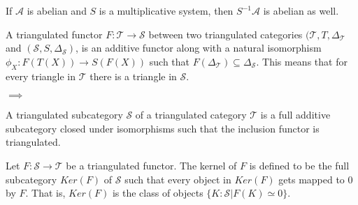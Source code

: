     \begin{corollary}
        If $\mathcal{A}$ is abelian and $S$ is a multiplicative system, then $S^{-1}\mathcal{A}$ is abelian as well.
    \end{corollary}

    \begin{definition}
        A triangulated functor $F: \mathcal{T} \rightarrow \mathcal{S}$ between two triangulated categories $(\mathcal{T}, T, \Delta_\mathcal{T}$ and $(\mathcal{S}, S, \Delta_\mathcal{S})$, is an additive functor along with a natural isomorphism $\phi_X : F(T(X)) \rightarrow S(F(X))$ such that $F(\Delta_{\mathcal{T}}) \subseteq \Delta_{\mathcal{S}}$. This means that for every triangle in $\mathcal{T}$ there is a triangle in $\mathcal{S}$.
        \begin{center}
            $\implies$
        \end{center}
    \end{definition}

    \begin{definition}
        A triangulated subcategory $\mathcal{S}$ of a triangulated category $\mathcal{T}$ is a full additive subcategory closed under isomorphisms such that the inclusion functor is triangulated.
    \end{definition}

    \begin{definition}
        Let $F : \mathcal{S} \rightarrow \mathcal{T}$ be a triangulated functor. The kernel of $F$ is defined to be the full subcategory $Ker(F)$ of $\mathcal{S}$ such that every object in $Ker(F)$ gets mapped to $0$ by $F$. That is, $Ker(F)$ is the class of objects $\{K : \mathcal{S} | F(K)\simeq 0\}$.
    \end{definition}

